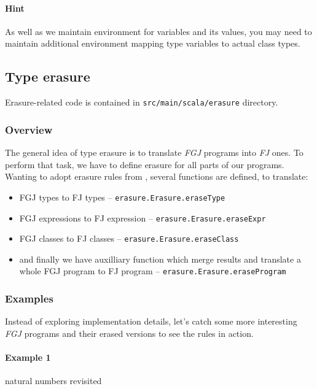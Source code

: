 \documentclass{article}[12pt]
\begin{document}
\paragraph{Hint} As well as we maintain environment for variables
and its values, you may need to maintain additional environment
mapping type variables to actual class types.


\subsection{Type erasure}

Erasure-related code is contained in \texttt{src/main/scala/erasure}
directory.

\subsubsection{Overview}

The general idea of type erasure is to translate \emph{FGJ}
programs into \emph{FJ} ones. To perform that task, we have to
define erasure for all parts of our programs. Wanting to adopt
erasure rules from \cite{fj}, several functions are defined, to
translate:

\begin{itemize}
\item FGJ types to FJ types -- \texttt{erasure.Erasure.eraseType}
\item FGJ expressions to FJ expression --
  \texttt{erasure.Erasure.eraseExpr}
\item FGJ classes to FJ classes -- \texttt{erasure.Erasure.eraseClass}
\item and finally we have auxilliary function which merge results
  and translate a whole FGJ program to FJ program --
  \texttt{erasure.Erasure.eraseProgram}
\end{itemize}

\subsubsection{Examples}

Instead of exploring implementation details, let's catch some more
interesting \emph{FGJ} programs and their erased versions to see
the rules in action.

\paragraph{Example 1} natural numbers revisited
\end{document}
